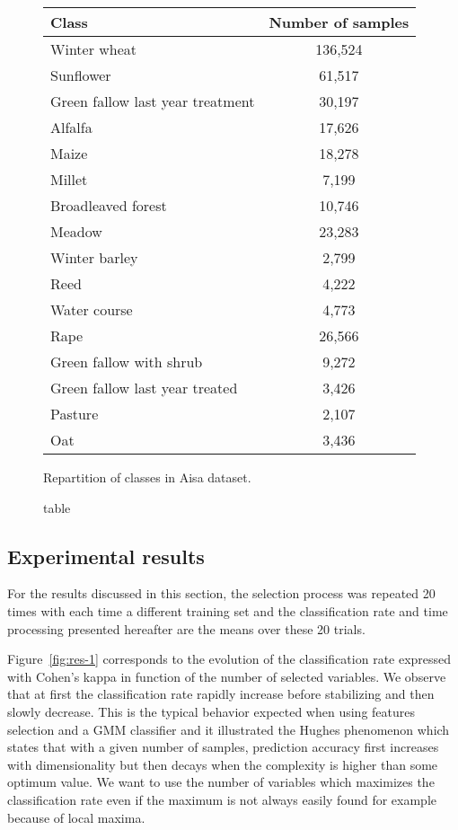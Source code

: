 \documentclass[a4paper,11pt,DIV=16]{scrartcl}
\begin{document}
        \begin{figure}[!ht]
            \centering
            \begin{tabular}[b]{lc}\hline
              Class & Number of samples \\ \hline
              Winter wheat & 136,524 \\
              Sunflower & 61,517 \\
              Green fallow last year treatment & 30,197 \\
              Alfalfa & 17,626 \\
              Maize & 18,278 \\
              Millet & 7,199 \\
              Broadleaved forest & 10,746 \\
              Meadow & 23,283 \\
              Winter barley & 2,799 \\
              Reed & 4,222 \\
              Water course & 4,773 \\
              Rape & 26,566 \\
              Green fallow with shrub & 9,272 \\
              Green fallow last year treated & 3,426 \\
              Pasture & 2,107 \\
              Oat & 3,436 \\ \hline
            \end{tabular}
            \caption{table}{Repartition of classes in Aisa dataset.\label{tab:aisa}}
        \end{figure}

        \subsection{Experimental results}

        For the results discussed in this section, the selection process was repeated 20 times with each time a different training set and the classification rate and time processing presented hereafter are the means over these 20 trials.

        Figure~\ref{fig:res-1} corresponds to the evolution of the classification rate expressed with Cohen's kappa in function of the number of selected variables. We observe that at first the classification rate rapidly increase before stabilizing and then slowly decrease. This is the typical behavior expected when using features selection and a GMM classifier and it illustrated the Hughes phenomenon \cite{hughes1968mean} which states that with a given number of samples, prediction accuracy first increases with dimensionality but then decays when the complexity is higher than some optimum value. We want to use the number of variables which maximizes the classification rate even if the maximum is not always easily found for example because of local maxima.
\end{document}

